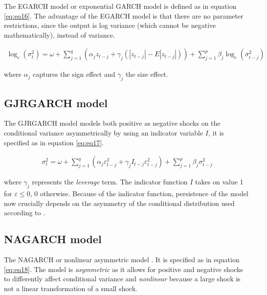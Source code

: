 \documentclass[a4paper, twoside]{templates/ociamthesis}
\begin{document}
\noindent The EGARCH model or exponential GARCH model \autocite{nelson1991} is defined as in equation \eqref{eq:eq16}. The advantage of the EGARCH model is that there are no parameter restrictions, since the output is log variance (which cannot be negative mathematically), instead of variance.

\begin{align}
\log_e(\sigma_t^2) = \omega + \sum\limits_{j=1}^q (\alpha_j z_{t-j} + \gamma_j (|z_{t-j}| - E|z_{t-j}|))+ \sum\limits_{j = 1}^p \beta_j \log_e(\sigma_{t-j}^2)
 \label{eq:eq16}
\end{align}

\noindent where \(\alpha_j\) captures the sign effect and \(\gamma_j\) the size effect.

\hypertarget{gjrgarch-model}{%
\subsection{GJRGARCH model}\label{gjrgarch-model}}

\noindent The GJRGARCH model \autocite{glosten1993} models both positive as negative shocks on the conditional variance asymmetrically by using an indicator variable \(I\), it is specified as in equation \eqref{eq:eq17}.

\begin{align}
\sigma_t^2 = \omega + \sum\limits_{j=1}^q (\alpha_j \varepsilon_{t-j}^2 + \gamma_j I_{t-j} \varepsilon_{t-j}^2) + \sum\limits_{j = 1}^p \beta_j \sigma_{t-j}^2
 \label{eq:eq17}
\end{align}

\noindent where \(\gamma_j\) represents the \emph{leverage} term. The indicator function \(I\) takes on value 1 for \(\varepsilon \le 0\), 0 otherwise. Because of the indicator function, persistence of the model now crucially depends on the asymmetry of the conditional distribution used according to \textcite{ghalanos2020}.

\hypertarget{nagarch-model}{%
\subsection{NAGARCH model}\label{nagarch-model}}

\noindent The NAGARCH or nonlinear asymmetric model \autocite{engle1993}. It is specified as in equation \eqref{eq:eq18}. The model is \emph{asymmetric} as it allows for positive and negative shocks to differently affect conditional variance and \emph{nonlinear} because a large shock is not a linear transformation of a small shock.
\end{document}
